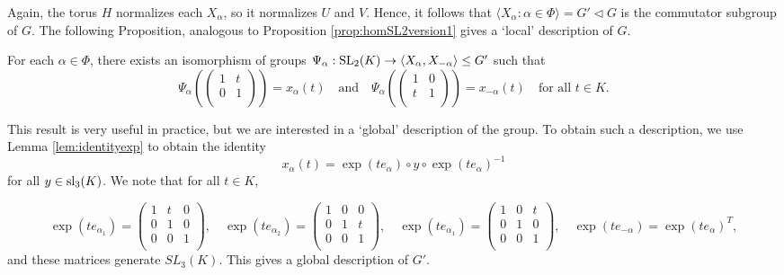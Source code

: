 Again, the torus $H$ normalizes each $X_\alpha$, so it normalizes $U$ and $V$. Hence, it follows that $\langle X_\alpha:\alpha\in\Phi\rangle=G'\triangleleft G$ is the commutator subgroup of $G$. The following Proposition, analogous to Proposition \ref{prop:homSL2version1} gives a `local' description of $G$.

\begin{proposition}
    For each $\alpha\in\Phi$, there exists an isomorphism of groups 
    $\Psi_\alpha:\mathrm{SL}_2(K)\rightarrow\langle X_\alpha,X_{-\alpha}\rangle\leq G'$
    such that 
    $$\Psi_\alpha\left(\begin{pmatrix}
        1 & t\\
        0 & 1\\
    \end{pmatrix}\right)=x_\alpha(t)\quad\text{and}\quad\Psi_\alpha\left(\begin{pmatrix}
        1 & 0\\
        t & 1\\
    \end{pmatrix}\right)=x_{-\alpha}(t)\quad\text{for all $t\in K$}.$$
\end{proposition}

\iffalse
\begin{proof}
    Again, the idea is to construct $\Psi_\alpha$ as a representation of $\SL_2(K)$. To do this, we break $$\fg_K=\langle h_\alpha\rangle^\perp\oplus(\langle h_\alpha\rangle\oplus\fg_\alpha\oplus\fg_{-\alpha})\oplus(\fg_) $$
\end{proof}
\fi
\vspace{0.2cm}
This result is very useful in practice, but we are interested in a `global' description of the group. To obtain such a description, we use Lemma \ref{lem:identityexp} to obtain the identity
$$x_\alpha(t)=\exp(te_\alpha)\circ y\circ\exp(te_\alpha)^{-1}$$
for all $y\in\mathrm{sl}_3(K)$.
We note that for all $t\in K$,

\begin{equation}\label{eq:exp}
\exp(te_{\alpha_1})=\begin{pmatrix}
    1 & t & 0\\
    0 & 1 & 0\\
    0 & 0 & 1\\
\end{pmatrix},\quad\exp(te_{\alpha_2})=\begin{pmatrix}
    1 & 0 & 0\\
    0 & 1 & t\\
    0 & 0 & 1\\
\end{pmatrix},\quad\exp(te_{\alpha_1})=\begin{pmatrix}
    1 & 0 & t\\
    0 & 1 & 0\\
    0 & 0 & 1\\
\end{pmatrix},\quad\exp(te_{-\alpha})=\exp(te_\alpha)^T,
\end{equation}
and these matrices generate $SL_3(K)$. This gives a global description of $G'$.

